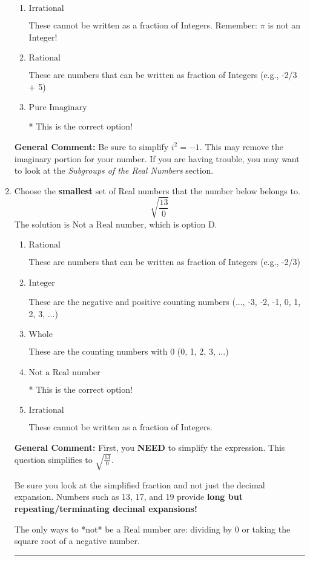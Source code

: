 \documentclass{extbook}[14pt]
\newcommand{\litem}[1]{\item #1

\rule{\textwidth}{0.4pt}}
\begin{document}
\begin{enumerate}
{\begin{enumerate}[label=\Alph*.]
This is a Complex number $(a+bi)$ that is not Real (has $i$ as part of the number).
\item \( \text{Irrational} \)

These cannot be written as a fraction of Integers. Remember: $\pi$ is not an Integer!
\item \( \text{Rational} \)

These are numbers that can be written as fraction of Integers (e.g., -2/3 + 5)
\item \( \text{Pure Imaginary} \)

* This is the correct option!
\end{enumerate}

\textbf{General Comment:} Be sure to simplify $i^2 = -1$. This may remove the imaginary portion for your number. If you are having trouble, you may want to look at the \textit{Subgroups of the Real Numbers} section.
}
\litem{
Choose the \textbf{smallest} set of Real numbers that the number below belongs to.
\[ \sqrt{\frac{13}{0}} \]The solution is \( \text{Not a Real number} \), which is option D.\begin{enumerate}[label=\Alph*.]
\item \( \text{Rational} \)

These are numbers that can be written as fraction of Integers (e.g., -2/3)
\item \( \text{Integer} \)

These are the negative and positive counting numbers (..., -3, -2, -1, 0, 1, 2, 3, ...)
\item \( \text{Whole} \)

These are the counting numbers with 0 (0, 1, 2, 3, ...)
\item \( \text{Not a Real number} \)

* This is the correct option!
\item \( \text{Irrational} \)

These cannot be written as a fraction of Integers.
\end{enumerate}

\textbf{General Comment:} First, you \textbf{NEED} to simplify the expression. This question simplifies to $\sqrt{\frac{13}{0}}$. 
 
 Be sure you look at the simplified fraction and not just the decimal expansion. Numbers such as 13, 17, and 19 provide \textbf{long but repeating/terminating decimal expansions!} 
 
 The only ways to *not* be a Real number are: dividing by 0 or taking the square root of a negative number. 
 
}
\end{enumerate}
\end{document}
